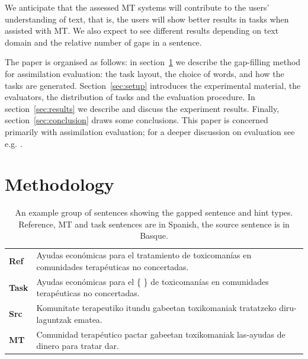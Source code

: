 \documentclass[11pt]{article}
\begin{document}
We anticipate that the assessed MT systems will contribute to the users' understanding of text, that is, the users will show better results in tasks when assisted with MT. We also expect to see different results depending on text domain and the relative number of gaps in a sentence.

The paper is organised as follows: in section~\ref{sec:methodology} we describe the gap-filling method for assimilation evaluation: the task layout, the choice of words, and how the tasks are generated. Section~\ref{sec:setup} introduces the experimental material, the evaluators, the distribution of tasks and the evaluation procedure. In section~\ref{sec:results} we describe and discuss the experiment results. Finally, section~\ref{sec:conclusion} draws some conclusions. This paper is concerned primarily with assimilation evaluation; for a deeper discussion on evaluation see e.g. \citep{koehn2010}.


\section{Methodology}
\label{sec:methodology}

\begin{table}
  \centering
  \begin{tabular}{|l|l|}
     \hline
     \textbf{Ref}  & Ayudas econ\'{o}micas para el tratamiento de toxicoman\'{i}as en comunidades terap\'{e}uticas no concertadas. \\
     \textbf{Task} & Ayudas econ\'{o}micas para el \{ \} de toxicoman\'{i}as en comunidades terap\'{e}uticas no concertadas. \\
     \textbf{Src}  & Komunitate terapeutiko itundu gabeetan toxikomaniak tratatzeko diru-laguntzak ematea. \\
     \textbf{MT}   & Comunidad terap\'{e}utico pactar gabeetan toxikomaniak las-ayudas de dinero para tratar dar. \\
     \hline
  \end{tabular}
  \caption{An example group of sentences showing the gapped sentence and hint types. Reference, MT and task sentences are in Spanish, the source sentence is in Basque.} 
  \label{table:example}
\end{table}
\end{document}
